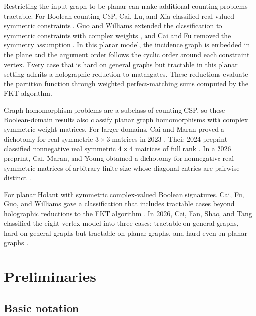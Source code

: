 \documentclass[11pt,letterpaper,onecolumn]{article}
\theoremstyle{plain}
\theoremstyle{definition}
\theoremstyle{remark}
\begin{document}
	Restricting the input graph to be planar can make additional counting
	problems tractable.  For Boolean counting CSP, Cai, Lu, and Xia classified
	real-valued symmetric constraints \cite{CaiLuXia2017PlanarCSP}.
	Guo and Williams extended the classification to symmetric constraints with
	complex weights \cite{GuoWilliams2020PlanarCSP}, and Cai and Fu removed the
	symmetry assumption \cite{CaiFu2022PlanarCSP}.  In this planar model, the
	incidence graph is embedded in the plane and the argument order follows
	the cyclic order around each constraint vertex.  Every case that is hard
	on general graphs but tractable in this planar setting admits a holographic
	reduction to matchgates.  These reductions evaluate the partition function
	through weighted perfect-matching sums computed by the FKT algorithm.
	
	Graph homomorphism problems are a subclass of counting CSP, so these
	Boolean-domain results also classify planar graph homomorphisms with
	complex symmetric weight matrices.  For larger domains, Cai and Maran
	proved a dichotomy for real symmetric \(3\times3\) matrices in 2023
	\cite{CaiMaran2023PlanarGH}.  Their 2024 preprint classified nonnegative
	real symmetric \(4\times4\) matrices of full rank
	\cite{CaiMaran2024PlanarGH}.  In a 2026 preprint, Cai, Maran, and Young
	obtained a dichotomy for nonnegative real symmetric matrices of arbitrary
	finite size whose diagonal entries are pairwise distinct
	\cite{CaiMaranYoung2026}.
	
	For planar Holant with symmetric complex-valued Boolean signatures,
	Cai, Fu, Guo, and Williams gave a classification that includes tractable
	cases beyond holographic reductions to the FKT algorithm
	\cite{CaiFuGuoWilliams2022PlanarHolant}.  In 2026, Cai, Fan, Shao, and Tang
	classified the eight-vertex model into three cases: tractable on general
	graphs, hard on general graphs but tractable on planar graphs, and hard
	even on planar graphs \cite{CaiFanShaoTang2026}.
	
	\section{Preliminaries}
\label{sec:preliminaries}

\subsection{Basic notation}
\label{subsec:foundational-algebra}
\label{subsec:graph-code-walsh-terminology}
\end{document}
